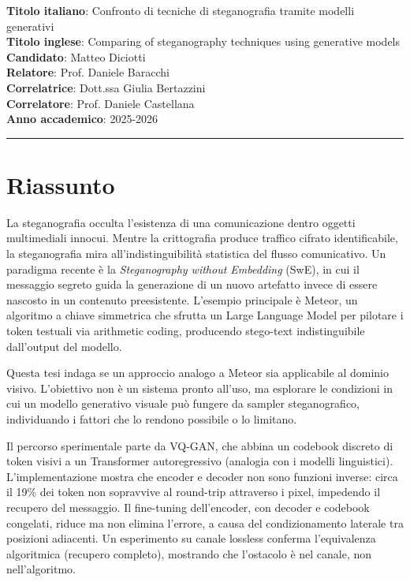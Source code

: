 \documentclass[a4paper, 11pt]{article}
\begin{document}
\pagestyle{empty}
\noindent
\textbf{Titolo italiano}: Confronto di tecniche di steganografia tramite modelli generativi\\
\textbf{Titolo inglese}: Comparing of steganography techniques using generative models\\
\textbf{Candidato}: Matteo Diciotti\\
\textbf{Relatore}: Prof. Daniele Baracchi\\
\textbf{Correlatrice}: Dott.ssa Giulia Bertazzini\\
\textbf{Correlatore}: Prof. Daniele Castellana\\
\textbf{Anno accademico}: 2025-2026\\
\vspace{1ex}
\hrule

\section*{Riassunto}
La steganografia occulta l'esistenza di una comunicazione dentro oggetti multimediali innocui. Mentre la crittografia produce traffico cifrato identificabile, la steganografia mira all'indistinguibilità statistica del flusso comunicativo. Un paradigma recente è la \emph{Steganography without Embedding} (SwE), in cui il messaggio segreto guida la generazione di un nuovo artefatto invece di essere nascosto in un contenuto preesistente. L'esempio principale è Meteor, un algoritmo a chiave simmetrica che sfrutta un Large Language Model per pilotare i token testuali via arithmetic coding, producendo stego-text indistinguibile dall'output del modello.

Questa tesi indaga se un approccio analogo a Meteor sia applicabile al dominio visivo. L'obiettivo non è un sistema pronto all'uso, ma esplorare le condizioni in cui un modello generativo visuale può fungere da sampler steganografico, individuando i fattori che lo rendono possibile o lo limitano.

Il percorso sperimentale parte da VQ-GAN, che abbina un codebook discreto di token visivi a un Transformer autoregressivo (analogia con i modelli linguistici). L'implementazione mostra che encoder e decoder non sono funzioni inverse: circa il 19\% dei token non sopravvive al round-trip attraverso i pixel, impedendo il recupero del messaggio. Il fine-tuning dell'encoder, con decoder e codebook congelati, riduce ma non elimina l'errore, a causa del condizionamento laterale tra posizioni adiacenti. Un esperimento su canale lossless conferma l'equivalenza algoritmica (recupero completo), mostrando che l'ostacolo è nel canale, non nell'algoritmo.
\end{document}
